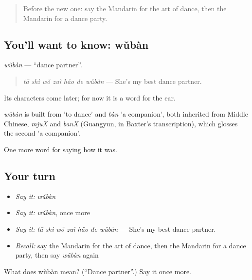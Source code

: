 \label{lesson:ZH-C505-wuban}



\begin{quote}
Before the new one: say the Mandarin for the art of dance, then the Mandarin for a dance party.
\end{quote}

\subsection*{You'll want to know: wǔbàn}
\emph{wǔbàn} — \textquotedblleft{}dance partner\textquotedblright{}.

\begin{quote}
\emph{tā shì wǒ zuì hǎo de wǔbàn} — She's my best dance partner.
\end{quote}

Its characters come later; for now it is a word for the ear.

\begin{cousinweb}
\emph{wǔbàn} is built from  'to dance' and \emph{bàn} 'a companion', both inherited from Middle Chinese, \emph{mjuX} and \emph{banX} (Guangyun, in Baxter's transcription), which glosses the second 'a companion'.
\end{cousinweb}

\begin{grammarlens}[title={What you've built}]
One more word for saying how it was.
\end{grammarlens}

\subsection*{Your turn}
\begin{itemize}
\raggedright
  \item \emph{Say it:} \emph{wǔbàn}
  \item \emph{Say it:} \emph{wǔbàn}, once more
  \item \emph{Say it:} \emph{tā shì wǒ zuì hǎo de wǔbàn} — She's my best dance partner.
  \item \emph{Recall:} say the Mandarin for the art of dance, then the Mandarin for a dance party, then say \emph{wǔbàn} again
\end{itemize}

\begin{tcolorbox}[breakable,colback=teal!4,colframe=teal!35!black,title={Before you move on}]
What does wǔbàn mean? (\textquotedblleft{}Dance partner\textquotedblright{}.) Say it once more.
\end{tcolorbox}
